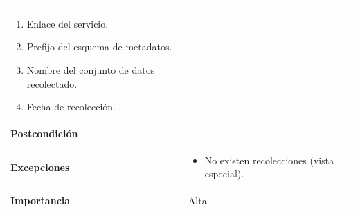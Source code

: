 \documentclass[
]{article}
\providecommand{\tightlist}{%
  \setlength{\itemsep}{0pt}\setlength{\parskip}{0pt}}
\begin{document}
\begin{longtable}[]{@{}ll@{}}
\begin{minipage}[t]{0.76\columnwidth}
\begin{enumerate}
  \begin{enumerate}
  \def\labelenumii{\alph{enumii}.}
  \tightlist
  \item
    Enlace del servicio.
  \item
    Prefijo del esquema de metadatos.
  \item
    Nombre del conjunto de datos recolectado.
  \item
    Fecha de recolección.
  \end{enumerate}
\end{enumerate}\strut
\end{minipage}\tabularnewline
\begin{minipage}[t]{0.19\columnwidth}\raggedright
\textbf{Postcondición}\strut
\end{minipage} & \begin{minipage}[t]{0.76\columnwidth}\raggedright
\strut
\end{minipage}\tabularnewline
\begin{minipage}[t]{0.19\columnwidth}\raggedright
\textbf{Excepciones}\strut
\end{minipage} & \begin{minipage}[t]{0.76\columnwidth}\raggedright
\begin{itemize}
\tightlist
\item
  No existen recolecciones (vista especial).
\end{itemize}\strut
\end{minipage}\tabularnewline
\begin{minipage}[t]{0.19\columnwidth}\raggedright
\textbf{Importancia}\strut
\end{minipage} & \begin{minipage}[t]{0.76\columnwidth}\raggedright
Alta\strut
\end{minipage}\tabularnewline
\bottomrule
\end{longtable}
\end{document}
